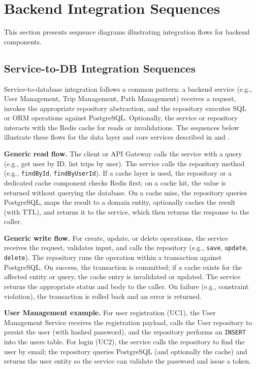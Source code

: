 \section{Backend Integration Sequences}
\label{sec:backend_integration_sequences}%

This section presents sequence diagrams illustrating integration flows for backend components.

\subsection{Service-to-DB Integration Sequences}
\label{subsec:service_to_db_sequences}%

Service-to-database integration follows a common pattern: a backend service (e.g., User Management, Trip Management, Path Management) receives a request, invokes the appropriate repository abstraction, and the repository executes SQL or ORM operations against PostgreSQL. Optionally, the service or repository interacts with the Redis cache for reads or invalidations. The sequences below illustrate these flows for the data layer and core services described in  and .

\textbf{Generic read flow.} The client or API Gateway calls the service with a query (e.g., get user by ID, list trips by user). The service calls the repository method (e.g., \texttt{findById}, \texttt{findByUserId}). If a cache layer is used, the repository or a dedicated cache component checks Redis first; on a cache hit, the value is returned without querying the database. On a cache miss, the repository queries PostgreSQL, maps the result to a domain entity, optionally caches the result (with TTL), and returns it to the service, which then returns the response to the caller.

\textbf{Generic write flow.} For create, update, or delete operations, the service receives the request, validates input, and calls the repository (e.g., \texttt{save}, \texttt{update}, \texttt{delete}). The repository runs the operation within a transaction against PostgreSQL. On success, the transaction is committed; if a cache exists for the affected entity or query, the cache entry is invalidated or updated. The service returns the appropriate status and body to the caller. On failure (e.g., constraint violation), the transaction is rolled back and an error is returned.

\textbf{User Management example.} For user registration (UC1), the User Management Service receives the registration payload, calls the User repository to persist the user (with hashed password), and the repository performs an \texttt{INSERT} into the users table. For login (UC2), the service calls the repository to find the user by email; the repository queries PostgreSQL (and optionally the cache) and returns the user entity so the service can validate the password and issue a token.

